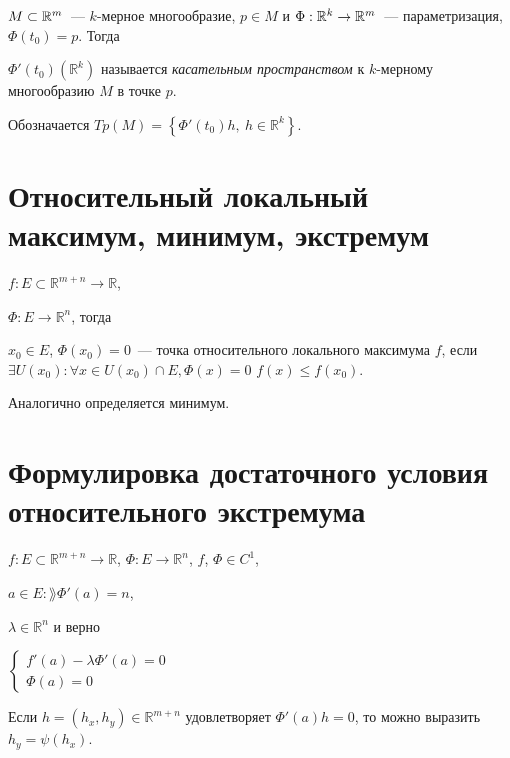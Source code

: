 \documentclass{article}
\begin{document}
        $M \subset \mathbb{R}^m$~--- $k$-мерное многообразие, $p \in M$ и $\Phi : \mathbb{R}^k \rightarrow \mathbb{R}^m$~--- параметризация, $\Phi(t_0) = p$. Тогда 
        
        $\Phi'(t_0) \left( \mathbb{R}^k \right)$ называется \textit{касательным пространством} к $k$-мерному многообразию $M$ в точке $p$. 
        
        Обозначается $Tp(M) = \left\{ \Phi'(t_0) h, \ h \in \mathbb{R}^k \right\}$.
        
    \newpage
    
    \section{Относительный локальный максимум, минимум, экстремум}
    
        $f : E \subset \mathbb{R}^{m + n} \rightarrow \mathbb{R}$,
        
        $\Phi : E \rightarrow \mathbb{R}^n$, тогда
        
        $x_0 \in E$, $\Phi(x_0) = 0$~--- точка относительного локального максимума $f$, если $\exists U (x_0) : \forall x \in U(x_0) \cap E, \Phi(x) = 0$ $f(x) \leq f(x_0)$. 
        
        Аналогично определяется минимум.
        
    \newpage
    
    \section{Формулировка достаточного условия относительного экстремума}
    
        $f : E \subset \mathbb{R}^{m + n} \rightarrow \mathbb{R}$, $\Phi : E \rightarrow \mathbb{R}^n$, $f$, $\Phi \in C^1$, 
        
        $a \in E : \rang \Phi'(a) = n$,
        
        $\lambda \in \mathbb{R}^n$ и верно
        
        $
            \begin{cases}
    
                f'(a) - \lambda \Phi'(a) = 0 \\
                
                \Phi(a) = 0
                
            \end{cases}
        $
        
        Если $h = ( h_x, h_y ) \in \mathbb{R}^{m + n}$ удовлетворяет $\Phi'(a) h = 0$, то можно выразить $h_y = \psi(h_x)$.
        
\end{document}
